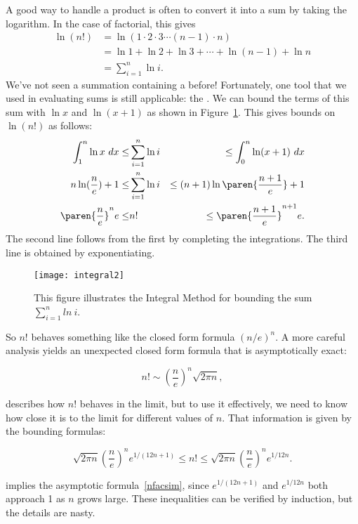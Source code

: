 A good way to handle a product is often to convert it into a sum by taking
the logarithm.  In the case of factorial, this gives
\begin{align*}
\ln (n!) 
       & =  \ln(1 \cdot 2 \cdot 3 \cdots (n-1) \cdot n) \\
       & =  \ln 1 + \ln 2 + \ln 3 + \cdots + \ln(n-1) + \ln n \\
       & =  \sum_{i=1}^n \ln i.
\end{align*}
We've not seen a summation containing a  before!
Fortunately, one tool that we used in evaluating sums is still applicable:
the .  We can bound the terms of this sum with $\ln
x$ and $\ln(x+1)$ as shown in Figure~\ref{fig:integral2}.  This gives
bounds on $\ln(n!)$ as follows:
\begin{eqnarray*}
\int_1^n \ln x \ dx \leq & \sum_{i=1}^n \ln i & \leq \int_0^n \ln(x+1) \ dx \\
n \ln(\frac{n}{e}) + 1 \leq & \sum_{i=1}^n \ln i & \leq (n+1) \ln\paren{\frac{n+1}{e}} + 1 \\
\paren{\frac{n}{e}}^n e \leq & n! & \leq  \paren{\frac{n+1}{e}}^{n+1} e.
\end{eqnarray*}
The second line follows from the first by completing the integrations.
The third line is obtained by exponentiating.

\begin{figure}[htbp]
\centerline{%
\texttt{[image: integral2]}
}
\caption{This figure illustrates the Integral Method for bounding
the sum $\sum_{i=1}^n ln \ i$.}
\label{fig:integral2}
\end{figure}

So $n!$ behaves something like the closed form formula $(n/e)^n$.
A more careful analysis yields an unexpected closed form formula that is
asymptotically exact:
\begin{lemma*}
\begin{equation}\label{nfacsim}
n! \sim \left(\frac{n}{e}\right)^n \sqrt{2 \pi n},
\end{equation}
\end{lemma*}

 describes how $n!$ behaves in the limit, but to
use it effectively, we need to know how close it is to the limit for
different values of $n$.  That information is given by the bounding
formulas:
\begin{fact*}
\[
\sqrt{2 \pi n} \left(\frac{n}{e}\right)^n e^{1/(12n+1)} \leq n! \leq
\sqrt{2 \pi n} \left(\frac{n}{e}\right)^n e^{1/12n}.
\]
\end{fact*}
 implies the asymptotic
formula~\eqref{nfacsim}, since $e^{1/(12n+1)}$ and $e^{1/12n}$ both
approach 1 as $n$ grows large.  These inequalities can be verified by
induction, but the details are nasty.

